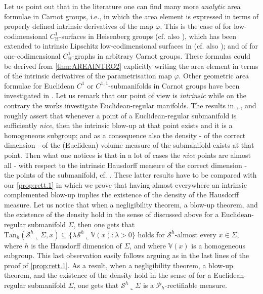 \documentclass[10pt, a4paper,
oneside, headinclude,footinclude]{scrartcl}
\begin{document}
Let us point out that in the literature one can find many more \textit{analytic} area formulae in Carnot groups, i.e., in which the area element is expressed in terms of properly defined intrinsic derivatives of the map $\varphi$. This is the case of \cite[Theorem 1.1 and Theorem 1.2]{CM20} for low-codimensional $C^1_{\mathrm H}$-surfaces in Heisenberg groups (cf. also \cite[Theorem 2]{FSSC06}), which has been extended to intrinsic Lipschitz low-codimensional surfaces  in \cite[Theorem 1.3]{Vittone20} (cf. also \cite[Theorem 1.6]{CMPSC14}); %
and of \cite[Proposition 1.8]{ADDDLD20} for one-codimensional $C^1_{\mathrm H}$-graphs in arbitrary Carnot groups. These formulas could be derived from \cref{thm:AREAINTRO2} explicitly writing the area element in terms of the intrinsic derivatives of the parametrisation map $\varphi$. Other geometric area formulae for Euclidean $C^1$ or $C^{1,1}$-submanifolds in Carnot groups have been investigated in \cite{MV08, MTV15, MagnaniTowardArea}. Let us remark that our point of view is \textit{intrinsic} while on the contrary the works \cite{MV08, MTV15, MagnaniTowardArea} investigate Euclidean-regular manifolds. The results in \cite[Theorem 1.1 and Theorem 1.2]{MV08}, \cite[Theorem 1.1]{MTV15}, and \cite[Theorem 1.1 and Theorem 1.2]{MagnaniTowardArea} roughly assert that whenever a point of a Euclidean-regular submanifold is sufficiently \textit{nice}, then the intrinsic blow-up at that point exists and it is a homogeneous subgroup; and as a consequence also the density - of the correct dimension - of the (Euclidean) volume measure of the submanifold exists at that point. Then what one notices is that in a lot of cases the \textit{nice} points are almost all - with respect to the intrinsic Hausdorff measure of the correct dimension - the points of the submanifold, cf. \cite[Theorem 1.2]{MTV15}. These latter results have to be compared with our \cref{prop:rett.1} in which we prove that having almost everywhere an intrinsic complemented blow-up implies the existence of the density of the Hausdorff measure. Let us notice that when a negligibility theorem, a blow-up theorem, and the existence of the density hold in the sense of \cite{MV08, MTV15, MagnaniTowardArea} discussed above for a Euclidean-regular submanifold $\Sigma$, then one gets that $\mathrm{Tan}_h(\mathcal{S}^h\llcorner\Sigma,x)\subseteq \{\lambda\mathcal{S}^h\llcorner\mathbb V(x):\lambda>0\}$ holds for $\mathcal{S}^h$-almost every $x\in\Sigma$, where $h$ is the Hausdorff dimension of $\Sigma$, and where $\mathbb V(x)$ is a homogeneous subgroup. This last observation easily follows arguing as in the last lines of the proof of \cref{prop:rett.1}. As a result, when a negligibility theorem, a blow-up theorem, and the existence of the density hold in the sense of \cite{MV08, MTV15,MagnaniTowardArea} for a Euclidean-regular submanifold $\Sigma$, one gets that $\mathcal{S}^h\llcorner\Sigma$ is a $\mathscr{P}_h$-rectifiable measure.
\end{document}
